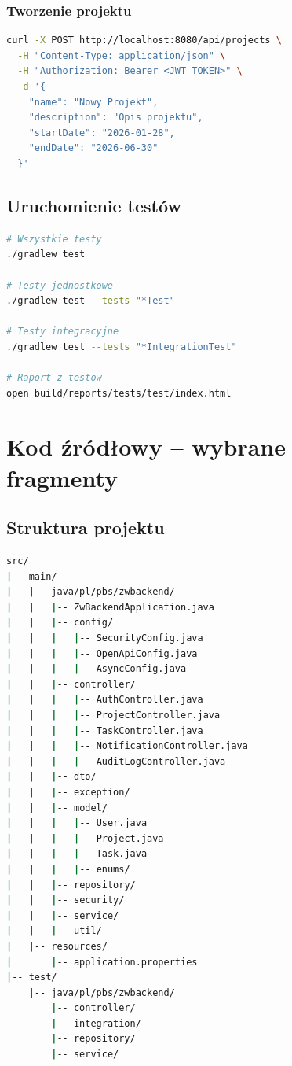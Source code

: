 \documentclass[12pt,a4paper]{report}
\begin{document}
\subsection{Tworzenie projektu}

\begin{lstlisting}[language=bash, caption={curl - tworzenie projektu}]
curl -X POST http://localhost:8080/api/projects \
  -H "Content-Type: application/json" \
  -H "Authorization: Bearer <JWT_TOKEN>" \
  -d '{
    "name": "Nowy Projekt",
    "description": "Opis projektu",
    "startDate": "2026-01-28",
    "endDate": "2026-06-30"
  }'
\end{lstlisting}

\section{Uruchomienie testów}

\begin{lstlisting}[language=bash, caption={Uruchomienie testów}]
# Wszystkie testy
./gradlew test

# Testy jednostkowe
./gradlew test --tests "*Test"

# Testy integracyjne
./gradlew test --tests "*IntegrationTest"

# Raport z testow
open build/reports/tests/test/index.html
\end{lstlisting}

\chapter{Kod źródłowy -- wybrane fragmenty}

\section{Struktura projektu}

\begin{lstlisting}[language=bash, caption={Struktura katalogów}]
src/
|-- main/
|   |-- java/pl/pbs/zwbackend/
|   |   |-- ZwBackendApplication.java
|   |   |-- config/
|   |   |   |-- SecurityConfig.java
|   |   |   |-- OpenApiConfig.java
|   |   |   |-- AsyncConfig.java
|   |   |-- controller/
|   |   |   |-- AuthController.java
|   |   |   |-- ProjectController.java
|   |   |   |-- TaskController.java
|   |   |   |-- NotificationController.java
|   |   |   |-- AuditLogController.java
|   |   |-- dto/
|   |   |-- exception/
|   |   |-- model/
|   |   |   |-- User.java
|   |   |   |-- Project.java
|   |   |   |-- Task.java
|   |   |   |-- enums/
|   |   |-- repository/
|   |   |-- security/
|   |   |-- service/
|   |   |-- util/
|   |-- resources/
|       |-- application.properties
|-- test/
    |-- java/pl/pbs/zwbackend/
        |-- controller/
        |-- integration/
        |-- repository/
        |-- service/
\end{lstlisting}
\end{document}

